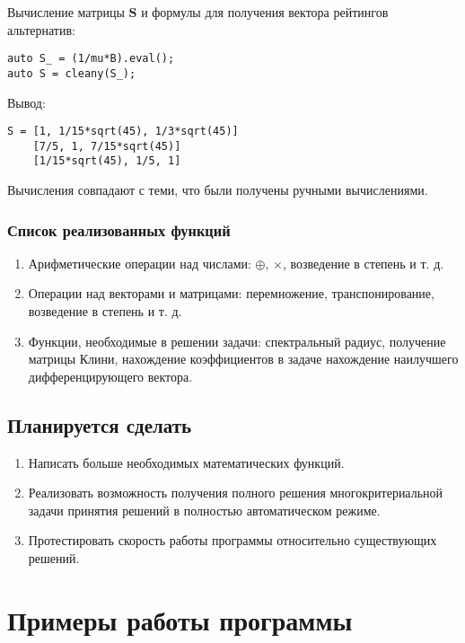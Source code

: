 \documentclass[specialist,
	substylefile = spbu_report.rtx,
	subf,href,colorlinks=true, 12pt]{disser}
\begin{document}
Вычисление матрицы $\boldsymbol{S}$ и формулы для получения вектора рейтингов альтернатив:
\begin{verbatim}
auto S_ = (1/mu*B).eval();
auto S = cleany(S_);
\end{verbatim}
Вывод:
\begin{verbatim}
S = [1, 1/15*sqrt(45), 1/3*sqrt(45)]
	[7/5, 1, 7/15*sqrt(45)]
	[1/15*sqrt(45), 1/5, 1]

\end{verbatim}

Вычисления совпадают с теми, что были получены ручными вычислениями.

\subsection{Список реализованных функций}

\begin{enumerate}
	\item Арифметические операции над числами: $\oplus$, $\times$, возведение в степень и т. д.
	\item Операции над векторами и матрицами: перемножение, транспонирование, возведение в степень и т. д.
	\item Функции, необходимые в решении задачи: спектральный радиус, получение матрицы Клини, нахождение коэффициентов в задаче нахождение наилучшего дифференцирующего вектора.
\end{enumerate}

\conclusion
\section{Планируется сделать}
\begin{enumerate}
	\item Написать больше необходимых математических функций.
	\item Реализовать возможность получения полного решения многокритериальной задачи принятия решений в полностью автоматическом режиме.
	\item Протестировать скорость работы программы относительно существующих решений.
\end{enumerate}

\printbibliography

\appendix
\cleardoublepage\makeatletter\@openrightfalse\makeatother
\chapter{Примеры работы программы}
\end{document}
